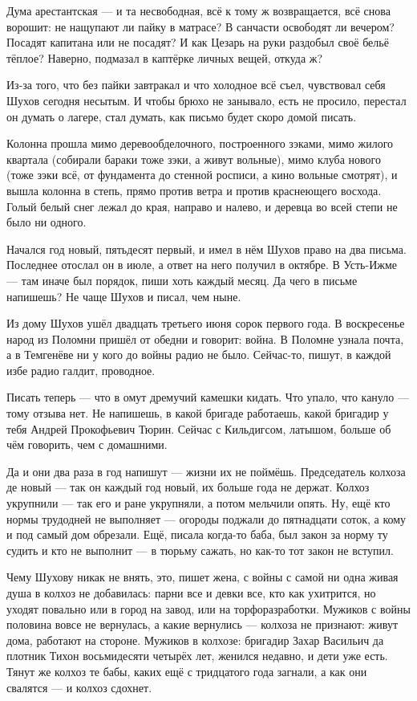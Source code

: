 Дума арестантская --- и та несвободная, всё к тому ж возвращается, всё снова ворошит: не 
нащупают ли пайку в матрасе? В санчасти освободят ли вечером? Посадят капитана или не 
посадят? И как Цезарь на руки раздобыл своё бельё тёплое? Наверно, подмазал в каптёрке личных 
вещей, откуда ж?

Из-за того, что без пайки завтракал и что холодное всё съел, чувствовал себя Шухов сегодня 
несытым. И чтобы брюхо не занывало, есть не просило, перестал он думать о лагере, стал думать, 
как письмо будет скоро домой писать.

Колонна прошла мимо деревообделочного, построенного зэками, мимо жилого квартала (собирали 
бараки тоже зэки, а живут вольные), мимо клуба нового (тоже зэки всё, от фундамента до стенной 
росписи, а кино вольные смотрят), и вышла колонна в степь, прямо против ветра и против 
краснеющего восхода. Голый белый снег лежал до края, направо и налево, и деревца во всей 
степи не было ни одного.

Начался год новый, пятьдесят первый, и имел в нём Шухов право на два письма. Последнее 
отослал он в июле, а ответ на него получил в октябре. В Усть-Ижме --- там иначе был порядок, пиши 
хоть каждый месяц. Да чего в письме напишешь? Не чаще Шухов и писал, чем ныне.

Из дому Шухов ушёл двадцать третьего июня сорок первого года. В воскресенье народ из Поломни 
пришёл от обедни и говорит: война. В Поломне узнала почта, а в Темгенёве ни у кого до войны 
радио не было. Сейчас-то, пишут, в каждой избе радио галдит, проводное.

Писать теперь --- что в омут дремучий камешки кидать. Что упало, что кануло --- тому отзыва нет. 
Не напишешь, в какой бригаде работаешь, какой бригадир у тебя Андрей Прокофьевич Тюрин. 
Сейчас с Кильдигсом, латышом, больше об чём говорить, чем с домашними.

Да и они два раза в год напишут --- жизни их не поймёшь. Председатель колхоза де новый --- так он 
каждый год новый, их больше года не держат. Колхоз укрупнили --- так его и ране укрупняли, а 
потом мельчили опять. Ну, ещё кто нормы трудодней не выполняет --- огороды поджали до 
пятнадцати соток, а кому и под самый дом обрезали. Ещё, писала когда-то баба, был закон за 
норму ту судить и кто не выполнит --- в тюрьму сажать, но как-то тот закон не вступил.

Чему Шухову никак не внять, это, пишет жена, с войны с самой ни одна живая душа в колхоз не 
добавилась: парни все и девки все, кто как ухитрится, но уходят повально или в город на завод, 
или на торфоразработки. Мужиков с войны половина вовсе не вернулась, а какие вернулись --- 
колхоза не признают: живут дома, работают на стороне. Мужиков в колхозе: бригадир Захар 
Васильич да плотник Тихон восьмидесяти четырёх лет, женился недавно, и дети уже есть. Тянут 
же колхоз те бабы, каких ещё с тридцатого года загнали, а как они свалятся --- и колхоз сдохнет.


